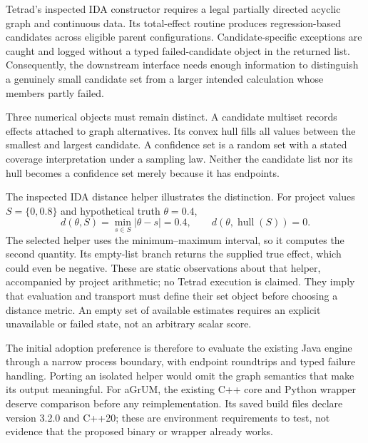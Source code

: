 Tetrad's inspected IDA constructor requires a legal partially directed acyclic
graph and continuous data. Its total-effect routine produces regression-based
candidates across eligible parent configurations. Candidate-specific exceptions
are caught and logged without a typed failed-candidate object in the returned
list. Consequently, the downstream interface needs enough information to
distinguish a genuinely small candidate set from a larger intended calculation
whose members partly failed. \cite{v12_sw_tetrad}

Three numerical objects must remain distinct. A candidate multiset records
effects attached to graph alternatives. Its convex hull fills all values
between the smallest and largest candidate. A confidence set is a random set
with a stated coverage interpretation under a sampling law. Neither the
candidate list nor its hull becomes a confidence set merely because it has
endpoints.

The inspected IDA distance helper illustrates the distinction. For project
values \(S=\{0,0.8\}\) and hypothetical truth \(\theta=0.4\),
\[
 d(\theta,S)=\min_{s\in S}|\theta-s|=0.4,
 \qquad d(\theta,\operatorname{hull}(S))=0.
\]
The selected helper uses the minimum--maximum interval, so it computes the
second quantity. Its empty-list branch returns the supplied true effect, which
could even be negative. These are static observations about that helper,
accompanied by project arithmetic; no Tetrad execution is claimed. They imply
that evaluation and transport must define their set object before choosing a
distance metric. An empty set of available estimates requires an explicit
unavailable or failed state, not an arbitrary scalar score. \cite{v12_sw_tetrad}

The initial adoption preference is therefore to evaluate the existing Java
engine through a narrow process boundary, with endpoint roundtrips and typed
failure handling. Porting an isolated helper would omit the graph semantics
that make its output meaningful. For aGrUM, the existing C++ core and Python
wrapper deserve comparison before any reimplementation. Its saved build files
declare version 3.2.0 and C++20; these are environment requirements to test,
not evidence that the proposed binary or wrapper already works.


